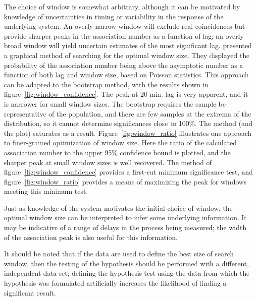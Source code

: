 \documentclass[letterpaper,11pt]{article}
\begin{document}
The choice of window is somewhat arbitrary, although it can be
motivated by knowledge of uncertainties in timing or variability in
the response of the underlying system. An overly narrow window will
exclude real coincidences but provide sharper peaks in the association
number as a function of lag; an overly broad window will yield
uncertain estimates of the most significant
lag. \citet{2002JGRA..107.1398H} presented a graphical method of
searching for the optimal window size. They displayed the probability
of the association number being above the asymptotic number as a
function of both lag and window size, based on Poisson
statistics. This approach can be adapted to the bootstrap method, with
the results shown in figure~\ref{fig:window_confidence}. The peak at
20 min. lag is very apparent, and it is narrower for small window
sizes. The bootstrap requires the sample be representative of the
population, and there are few samples at the extrema of the
distribution, so it cannot determine significances close to 100\%. The
method (and the plot) saturates as a
result. Figure~\ref{fig:window_ratio} illustrates one approach to
finer-grained optimization of window size. Here the ratio of the
calculated association number to the upper 95\% confidence bound is
plotted, and the sharper peak at small window sizes is well
recovered. The method of figure~\ref{fig:window_confidence} provides a
first-cut minimum significance test, and figure~\ref{fig:window_ratio}
provides a means of maximizing the peak for windows meeting this
minimum test.

Just as knowledge of the system motivates the initial choice of
window, the optimal window size can be interpreted to infer some
underlying information. It may be indicative of a range of delays in
the process being measured; the width of the association peak is also
useful for this information.

It should be noted that if the data are used to define the best size
of search window, then the testing of the hypothesis should be
performed with a different, independent data set; defining the
hypothesis test using the data from which the hypothesis was
formulated artificially increases the likelihood of finding a
significant result.
\end{document}
